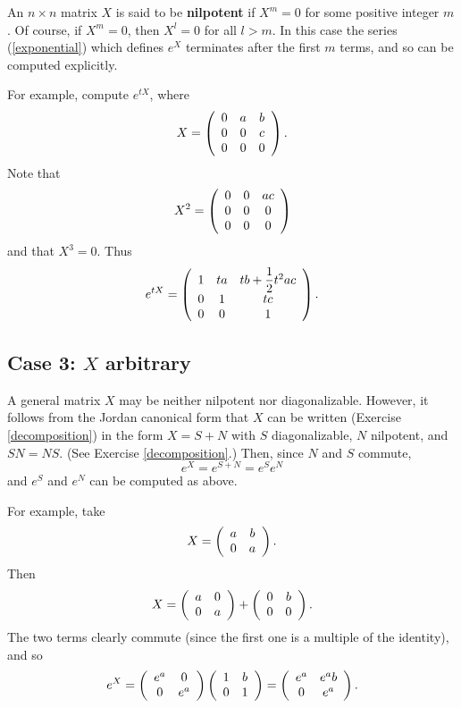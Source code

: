 \documentclass[12pt]{amsbook}
\theoremstyle{plain}
\numberwithin{equation}{chapter}
\numberwithin{theorem}{chapter}
\begin{document}
An $n\times n$ matrix $X$ is said to be \textbf{nilpotent} if $X^{m}=0$ for
some positive integer $m$. Of course, if $X^{m}=0$, then $X^{l}=0$ for all
$l>m$. In this case the series (\ref{exponential}) which defines $e^{X}$
terminates after the first $m$ terms, and so can be computed explicitly.

For example, compute $e^{tX}$, where
\[
X=\left(
\begin{array}
[c]{ccc}%
0 & a & b\\
0 & 0 & c\\
0 & 0 & 0
\end{array}
\right)  \text{.}%
\]
Note that
\[
X^{2}=\left(
\begin{array}
[c]{ccc}%
0 & 0 & ac\\
0 & 0 & 0\\
0 & 0 & 0
\end{array}
\right)
\]
and that $X^{3}=0$. Thus
\[
e^{tX}=\left(
\begin{array}
[c]{ccc}%
1 & ta & tb+\dfrac12t^{2}ac\\
0 & 1 & tc\\
0 & 0 & 1
\end{array}
\right)  \text{.}%
\]

\subsection{Case 3: $X$ arbitrary}

A general matrix $X$ may be neither nilpotent nor diagonalizable. However, it
follows from the Jordan canonical form that $X$ can be written (Exercise
\ref{decomposition}) in the form $X=S+N$ with $S$ diagonalizable, $N$
nilpotent, and $SN=NS$. (See Exercise \ref{decomposition}.) Then, since $N$
and $S$ commute,
\[
e^{X}=e^{S+N}=e^{S}e^{N}%
\]
and $e^{S}$ and $e^{N}$ can be computed as above.

For example, take
\[
X=\left(
\begin{array}
[c]{cc}%
a & b\\
0 & a
\end{array}
\right)  \text{.}%
\]
Then
\[
X=\left(
\begin{array}
[c]{cc}%
a & 0\\
0 & a
\end{array}
\right)  +\left(
\begin{array}
[c]{cc}%
0 & b\\
0 & 0
\end{array}
\right)  \text{.}%
\]
The two terms clearly commute (since the first one is a multiple of the
identity), and so
\[
e^{X}=\left(
\begin{array}
[c]{cc}%
e^{a} & 0\\
0 & e^{a}%
\end{array}
\right)  \left(
\begin{array}
[c]{cc}%
1 & b\\
0 & 1
\end{array}
\right)  =\left(
\begin{array}
[c]{cc}%
e^{a} & e^{a}b\\
0 & e^{a}%
\end{array}
\right)  \text{.}%
\]
\end{document}

